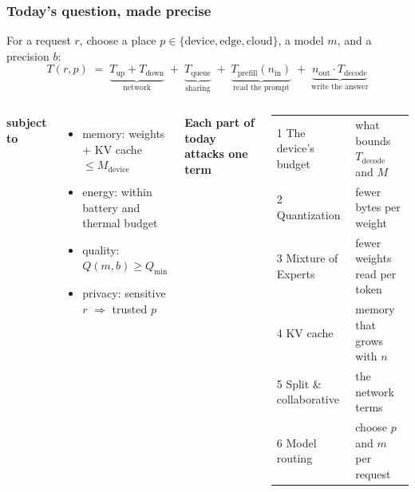 \begin{frame}
\frametitle{Today's question, made precise}
For a request $r$, choose a place $p\in\{\text{device},\text{edge},\text{cloud}\}$, a model $m$, and a precision $b$:
\[
T(r,p) \;=\; \underbrace{T_{\text{up}} + T_{\text{down}}}_{\text{network}}
\;+\; \underbrace{T_{\text{queue}}}_{\text{sharing}}
\;+\; \underbrace{T_{\text{prefill}}(n_{\text{in}})}_{\text{read the prompt}}
\;+\; \underbrace{n_{\text{out}}\cdot T_{\text{decode}}}_{\text{write the answer}}
\]
\begin{columns}[T]
\textbf{subject to}
\begin{itemize}
  \item memory: weights $+$ KV cache $\le M_{\text{device}}$
  \item energy: within battery and thermal budget
  \item quality: $Q(m,b)\ge Q_{\min}$
  \item privacy: sensitive $r$ $\Rightarrow$ trusted $p$
\end{itemize}
\textbf{Each part of today attacks one term}\\[3pt]
\small
\begin{tabular}{@{}ll@{}}
\toprule
1\; The device's budget & what bounds $T_{\text{decode}}$ and $M$ \\
2\; Quantization & fewer bytes per weight \\
3\; Mixture of Experts & fewer weights read per token \\
4\; KV cache & memory that grows with $n$ \\
5\; Split \& collaborative & the network terms \\
6\; Model routing & choose $p$ and $m$ per request \\
\bottomrule
\end{tabular}
\end{columns}
\end{frame}


